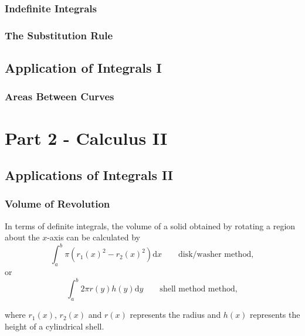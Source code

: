 \documentclass[]{book}
\theoremstyle{definition}
\theoremstyle{definition}
\theoremstyle{definition}
\theoremstyle{remark}
\begin{document}
\hypertarget{indefinite-integrals}{%
\section{Indefinite Integrals}\label{indefinite-integrals}}

\hypertarget{the-substitution-rule}{%
\section{The Substitution Rule}\label{the-substitution-rule}}

\hypertarget{application-of-integrals-i}{%
\chapter{Application of Integrals I}\label{application-of-integrals-i}}

\hypertarget{areas-between-curves}{%
\section{Areas Between Curves}\label{areas-between-curves}}

\hypertarget{part-part-2---calculus-ii}{%
\part*{Part 2 - Calculus II}\label{part-part-2---calculus-ii}}

\hypertarget{applications-of-integrals-ii}{%
\chapter{Applications of Integrals II}\label{applications-of-integrals-ii}}

\hypertarget{volume-of-revolution}{%
\section{Volume of Revolution}\label{volume-of-revolution}}

In terms of definite integrals, the volume of a solid obtained by rotating a region about the \(x\)-axis can be calculated by
\[\int_a^b \pi (r_1(x)^2 - r_2(x)^2) \mathrm{d} x \qquad \text{disk/washer method},\]
or
\[\int_a^b 2\pi r(y) h(y) \mathrm{d} y \qquad \text{shell method method},\]

where \(r_1(x)\), \(r_2(x)\) and \(r(x)\) represents the radius and \(h(x)\) represents the height of a cylindrical shell.
\end{document}
